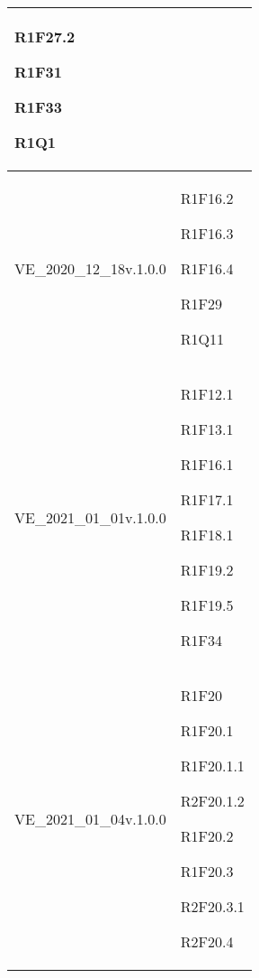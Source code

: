 \begin{center}
\begin{longtable}{|p{44mm}|p{22mm}|}
R1F27.2 \newline

R1F31 \newline

R1F33 \newline

 R1Q1 \newline
\\
\hline
VE\_2020\_12\_18v.1.0.0 &

R1F16.2 \newline

R1F16.3 \newline

R1F16.4 \newline

R1F29 \newline

R1Q11 \newline
\\
\hline
VE\_2021\_01\_01v.1.0.0 &

R1F12.1 \newline

R1F13.1 \newline

R1F16.1 \newline

R1F17.1 \newline

R1F18.1 \newline

R1F19.2 \newline

R1F19.5 \newline

R1F34 \newline
\\
\hline
VE\_2021\_01\_04v.1.0.0 &

R1F20 \newline

R1F20.1 \newline

R1F20.1.1 \newline

R2F20.1.2 \newline

R1F20.2 \newline

R1F20.3 \newline

R2F20.3.1 \newline

R2F20.4 \newline


\end{longtable}
\end{center}
